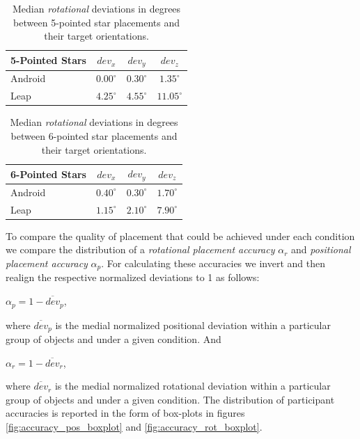 \begin{table}[htbp]
    \centering
    \begin{tabular}{|l|c c c|}	
        \hline 
        \textbf{5-Pointed Stars}	&	$dev_x$	&	$dev_y$	&	$dev_z$	\\ \hline
        Android	&	$0.00^{\circ}$	&	$0.30^{\circ}$	&	$1.35^{\circ}$	\\ \hline
        Leap	&	$4.25^{\circ}$	&	$4.55^{\circ}$	&	$11.05^{\circ}$	\\ \hline
    \end{tabular}
    \caption{
    \textsf{Median \textit{rotational} deviations in degrees between 5-pointed star placements and their target orientations.}
    }
    \label{table:rotational_deviation_5stars}
\end{table}

\begin{table}[htbp]
    \centering
    \begin{tabular}{|l|c c c|}
        \hline
        \textbf{6-Pointed Stars}	&	$dev_x$	&	$dev_y$	&	$dev_z$	\\ \hline
        Android	&	$0.40^{\circ}$	&	$0.30^{\circ}$	&	$1.70^{\circ}$	\\ \hline
        Leap	&	$1.15^{\circ}$	&	$2.10^{\circ}$	&	$7.90^{\circ}$	\\ \hline
    \end{tabular}
    \caption{
    \textsf{Median \textit{rotational} deviations in degrees between 6-pointed star placements and their target orientations.}
    }
    \label{table:rotational_deviation_6stars}
\end{table}

 
To compare the quality of placement that could be achieved under each condition we compare the distribution of a \textit{rotational placement accuracy} $\alpha_{r}$ and \textit{positional placement accuracy} $\alpha_{p}$.
For calculating these accuracies we invert and then realign the respective normalized deviations to 1 as follows:
\begin{center}
$\alpha_{p} = 1-\overline{dev}_{p}$,
\end{center}
where $\overline{dev}_{p}$ is the medial normalized positional deviation within a particular group of objects and under a given condition.
And
\begin{center}
$\alpha_{r} = 1-\overline{dev}_{r}$,
\end{center}
where $\overline{dev}_{r}$ is the medial normalized rotational deviation within a particular group of objects and under a given condition.
The distribution of participant accuracies is reported in the form of box-plots in figures \ref{fig:accuracy_pos_boxplot} and \ref{fig:accuracy_rot_boxplot}.


